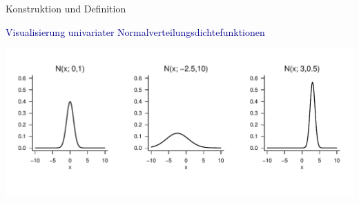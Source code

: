 \documentclass[
  8pt,
  ignorenonframetext,
]{beamer}
\begin{document}
\begin{frame}{Konstruktion und Definition}
\protect\hypertarget{konstruktion-und-definition-1}{}
\vspace{1mm}

\textcolor{darkblue}{Visualisierung univariater Normalverteilungsdichtefunktionen}
\vspace{1mm} \vspace{1cm}

\begin{center}\includegraphics[width=1\linewidth]{6_Abbildungen/mvda_6_normalverteilung_wdf} \end{center}
\end{frame}
\end{document}
